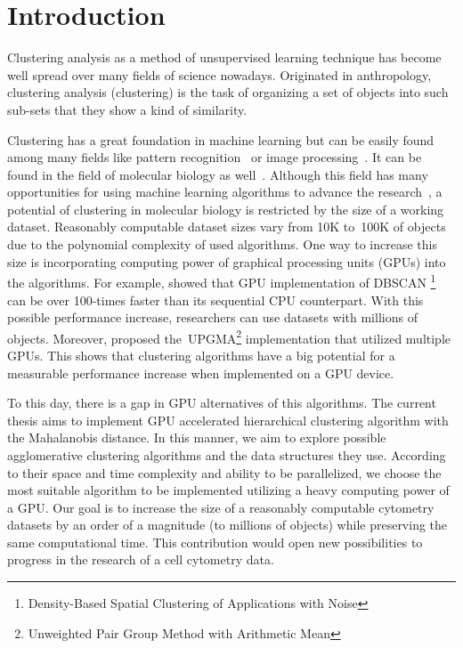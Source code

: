 \chapter*{Introduction}


Clustering analysis as a method of unsupervised learning technique has become well spread over many fields of science nowadays. Originated in anthropology, clustering analysis (clustering) is the task of organizing a set of objects into such sub-sets that they show a kind of similarity. 

Clustering has a great foundation in machine learning but can be easily found among many fields like pattern recognition~\cite{pare} or image processing~\cite{sathya2011image}. It can be found in the field of molecular biology as well~\cite{Nugent2010}. Although this field has many opportunities for using machine learning algorithms to advance the research~\cite{btaa091}, a potential of clustering in molecular biology is restricted by the size of a working dataset. Reasonably computable dataset sizes vary from 10K to~100K of objects due to the polynomial complexity of used algorithms. One way to increase this size is incorporating computing power of graphical processing units (GPUs) into the algorithms. For example, \citet{andrade2013g} showed that GPU implementation of DBSCAN \footnote{Density-Based Spatial Clustering of Applications with Noise} can be over 100-times faster than its sequential CPU counterpart. With this possible performance increase, researchers can use datasets with millions of objects. Moreover, \citet{hua2017mgupgma} proposed the~UPGMA\footnote{Unweighted Pair Group Method with Arithmetic Mean} implementation that utilized multiple GPUs. This shows that clustering algorithms have a big potential for a measurable performance increase when implemented on a GPU device.

To this day, there is a gap in GPU alternatives of this algorithms. The current thesis aims to implement GPU accelerated hierarchical clustering algorithm with the Mahalanobis distance. In this manner, we aim to explore possible agglomerative clustering algorithms and the data structures they use. According to their space and time complexity and ability to be parallelized, we choose the most suitable algorithm to be implemented utilizing a heavy computing power of a GPU. Our goal is to increase the size of a reasonably computable cytometry datasets by an order of a magnitude (to millions of objects) while preserving the same computational time. This contribution would open new possibilities to progress in the research of a cell cytometry data.

